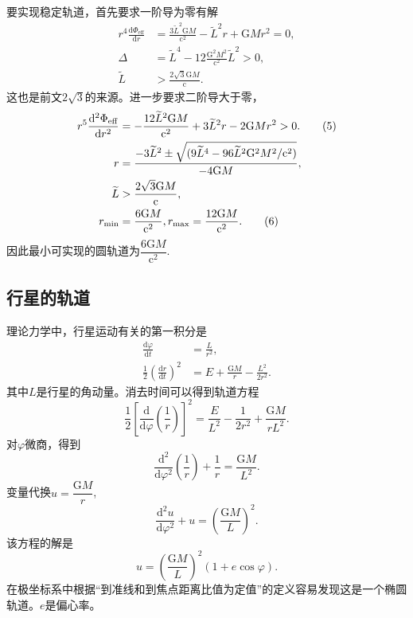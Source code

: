 \documentclass[11pt, a4paper, oneside, onecolumn]{ctexart}
\numberwithin{equation}{subsection}
\begin{document}
要实现稳定轨道，首先要求一阶导为零有解
\begin{align}
r^{4}\frac{\mathrm{d}\Phi_{\text{eff}}}{\mathrm{d}r}&=\frac{3\widetilde{L}^{2}\mathrm{G}M}{\mathrm{c}^{2}}-\widetilde{L}^{2}r+\mathrm{G}Mr^{2}=0,\\
\Delta{}&=\widetilde{L}^{4}-12\frac{\mathrm{G}^{2}M^{2}}{\mathrm{c}^{2}}\widetilde{L}^{2}>0,\\
\widetilde{L}&>\frac{2\sqrt{3}\mathrm{G}M}{\mathrm{c}}.
\end{align}
这也是前文$2\sqrt{3}$的来源。进一步要求二阶导大于零，
\begin{align}
r^{5}\frac{\mathrm{d}^{2}\Phi_{\text{eff}}}{\mathrm{d}r^{2}}&=-\frac{12\widetilde{L}^{2}\mathrm{G}M}{\mathrm{c}^{2}}+3\widetilde{L}^{2}r-2\mathrm{G}Mr^{2}>0.\tag{5}\\
r&=\frac{-3\widetilde{L}^{2}\pm\sqrt{(9\widetilde{L}^{4}-96\widetilde{L}^{2}\mathrm{G}^{2}M^{2}/\mathrm{c}^{2})}}{-4\mathrm{G}M},\notag\\
\widetilde{L}&>\frac{2\sqrt3\mathrm{G}M}{\mathrm{c}},\notag\\
r_{\min}&=\frac{6\mathrm{G}M}{\mathrm{c}^{2}},r_{\max}=\frac{12\mathrm{G}M}{\mathrm{c}^{2}}.\tag{6}
\end{align}
因此最小可实现的圆轨道为$\dfrac{6\mathrm{G}M}{\mathrm{c}^{2}}$.

\subsection{行星的轨道}
理论力学中，行星运动有关的第一积分是
\begin{align}
\frac{\mathrm{d}\varphi}{\mathrm{d}t}&=\frac{L}{r^{2}},\\
\frac12\left(\frac{\mathrm{d}r}{\mathrm{d}t}\right)^{2}&=E+\frac{\mathrm{G}M}{r}-\frac{L^{2}}{2r^{2}}.
\end{align}
其中$L$是行星的角动量。消去时间可以得到轨道方程
\begin{equation}
\frac{1}{2}\left[\frac{\mathrm{d}}{\mathrm{d}\varphi}\left(\frac{1}{r}\right)\right]^{2}=\frac{E}{L^{2}}-\frac{1}{2r^{2}}+\frac{\mathrm{G}M}{rL^{2}}.
\end{equation}
对$\varphi$微商，得到
\begin{equation}
\frac{\mathrm{d}^{2}}{\mathrm{d}\varphi^{2}}\left(\frac{1}{r}\right)+\frac{1}{r}=\frac{\mathrm{G}M}{L^{2}}.
\end{equation}
变量代换$u=\dfrac{\mathrm{G}M}{r}$,
\begin{equation}
\frac{\mathrm{d}^{2}u}{\mathrm{d}\varphi^{2}}+u=\left(\frac{\mathrm{G}M}{L}\right)^{2}.
\end{equation}
该方程的解是
\begin{equation}
u=\left(\frac{\mathrm{G}M}{L}\right)^{2}\left(1+e\cos\varphi\right).
\end{equation}
在极坐标系中根据“到准线和到焦点距离比值为定值”的定义容易发现这是一个椭圆轨道。$e$是偏心率。
\end{document}
